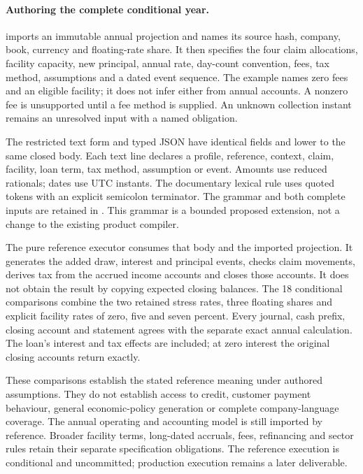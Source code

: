 \paragraph{Authoring the complete conditional year.}
 imports an immutable annual projection and names
its source hash, company, book, currency and floating-rate share. It then
specifies the four claim allocations, facility capacity, new principal,
annual rate, day-count convention, fees, tax method, assumptions and a dated
event sequence. The example names zero fees and an eligible facility; it does
not infer either from annual accounts. A nonzero fee is unsupported until a
fee method is supplied. An unknown collection instant remains an unresolved
input with a named obligation.

The restricted text form and typed JSON have identical fields and lower to
the same closed body. Each text line declares a profile, reference, context,
claim, facility, loan term, tax method, assumption or event. Amounts use reduced
rationals; dates use UTC instants. The documentary lexical rule uses quoted
tokens with an explicit semicolon terminator. The grammar and both complete
inputs are retained in
. This grammar is a
bounded proposed extension, not a change to the existing product compiler.

The pure reference executor consumes that body and the imported projection.
It generates the added draw, interest and principal events, checks claim
movements, derives tax from the accrued income accounts and closes those
accounts. It does not obtain the result by copying expected closing balances.
The 18 conditional comparisons combine the two retained stress rates, three
floating shares and explicit facility rates of zero, five and seven percent.
Every journal, cash prefix, closing account and statement agrees with the
separate exact annual calculation. The loan's interest and tax effects are
included; at zero interest the original closing accounts return exactly.

These comparisons establish the stated reference meaning under authored
assumptions. They do not establish access to credit, customer payment behaviour,
general economic-policy generation or complete company-language coverage.
The annual operating and accounting model is still imported by reference.
Broader facility terms, long-dated accruals, fees, refinancing and sector rules
retain their separate specification obligations. The reference execution is
conditional and uncommitted; production execution remains a later deliverable.
